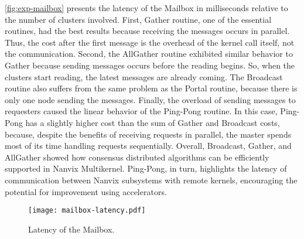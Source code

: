 			\autoref{fig:exp-mailbox} presents the latency of the Mailbox in
			milliseconds relative to the number of clusters involved. First,
			Gather routine, one of the essential routines, had the best results
			because receiving the messages occurs in parallel. Thus, the cost
			after the first message is the overhead of the kernel call itself,
			not the communication. Second, the AllGather routine exhibited similar
			behavior to Gather because sending messages occurs before the reading
			begins. So, when the clusters start reading, the latest messages are
			already coming. The Broadcast routine also suffers from the same problem
			as the Portal routine, because there is only one node sending
			the messages. Finally, the overload of sending
			messages to requesters caused the linear behavior of the Ping-Pong
			routine. In this case, Ping-Pong has a slightly higher cost than the
			sum of Gather and Broadcast costs, because, despite the benefits of
			receiving requests in parallel, the master spends most of its time
			handling requests sequentially. Overall, Broadcast, Gather, and
			AllGather showed how consensus distributed algorithms can be
			efficiently supported in Nanvix Multikernel. Ping-Pong, in turn,
			highlights the latency of communication between Nanvix subsystems
			with remote kernels, encouraging the potential for improvement using
			\dma accelerators.

			\begin{figure}[!tb]
				\centering%
				\caption{Latency of the Mailbox.}%
				\label{fig:exp-mailbox}%
				\texttt{[image: mailbox-latency.pdf]}%
			\end{figure}
